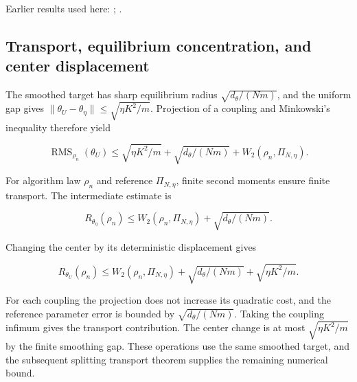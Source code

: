 \documentclass[11pt,a4paper]{report}
\begin{document}
Earlier results used here: \cite[Section~3.1.1]{LangevinLean2026IPLA}; \cite[Section~3.1.6]{LangevinLean2026IPLA}.
\subsection{\texorpdfstring{Transport, equilibrium concentration, and center displacement}{Transport, equilibrium concentration, and center displacement}}
\label{report-step-ProximalLangevin-SplittingProjection-lean-2}


The smoothed target has sharp equilibrium radius \(\sqrt{d_\theta/(Nm)}\), and the uniform gap gives \(\|\theta_U-\theta_\eta\|\le\sqrt{\eta K^2/m}\). Projection of a coupling and Minkowski’s inequality therefore yield

\[\operatorname{RMS}_{\rho_n}(\theta_U)\le\sqrt{\eta K^2/m}+\sqrt{d_\theta/(Nm)}+W_2(\rho_n,\Pi_{N,\eta}).\]

For algorithm law \(\rho_n\) and reference \(\Pi_{N,\eta}\), finite second moments ensure finite transport. The intermediate estimate is

\[R_{\theta_\eta}(\rho_n)\le W_2(\rho_n,\Pi_{N,\eta})+\sqrt{d_\theta/(Nm)}.\]

Changing the center by its deterministic displacement gives

\[R_{\theta_U}(\rho_n)\le W_2(\rho_n,\Pi_{N,\eta})+\sqrt{d_\theta/(Nm)}+\sqrt{\eta K^2/m}.\]

For each coupling the projection does not increase its quadratic cost, and the reference parameter error is bounded by \(\sqrt{d_\theta/(Nm)}\). Taking the coupling infimum gives the transport contribution. The center change is at most \(\sqrt{\eta K^2/m}\) by the finite smoothing gap. These operations use the same smoothed target, and the subsequent splitting transport theorem supplies the remaining numerical bound.
\end{document}
